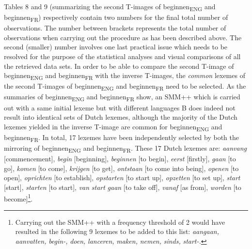Tables 8 and 9 (summarizing the second T-images of beginnen\textsubscript{ENG} and beginnen\textsubscript{FR}) respectively contain two numbers for the final total number of observations. The number between brackets represents the total number of observations when carrying out the procedure as has been described above. The second (smaller) number involves one last practical issue which needs to be resolved for the purpose of the statistical analyses and visual comparisons of all the retrieved data sets. In order to be able to compare the second T-image of beginnen\textsubscript{ENG} and beginnen\textsubscript{FR} with the inverse T-images, the \textit{common} lexemes of the second T-images of beginnen\textsubscript{ENG} and beginnen\textsubscript{FR} need to be selected. As the summaries of beginnen\textsubscript{ENG} and beginnen\textsubscript{FR} show, an SMM++ which is carried out with a same initial lexeme but with different languages B does indeed not result into identical sets of Dutch lexemes, although the majority of the Dutch lexemes yielded in the inverse T-image are common for beginnen\textsubscript{ENG} and beginnen\textsubscript{FR}. In total, 17 lexemes have been independently selected by both the mirroring of beginnen\textsubscript{ENG} and beginnen\textsubscript{FR}. These 17 Dutch lexemes are: \textit{aanvang} [commencement], \textit{begin} [beginning], \textit{beginnen} [to begin], \textit{eerst} [firstly], \textit{gaan} [to go], \textit{komen} [to come], \textit{krijgen} [to get], \textit{ontstaan} [to come into being], \textit{openen} [to open], \textit{oprichten} [to establish], \textit{opstarten} [to start up], \textit{opzetten} [to set up], \textit{start} [start], \textit{starten} [to start], \textit{van} \textit{start} \textit{gaan} [to take off], \textit{vanaf} [as from], \textit{worden} [to become]\footnote{Carrying out the SMM++ with a frequency threshold of 2 would have resulted in the following 9 lexemes to be added to this list: \textit{aangaan,} \textit{aanvatten,} \textit{begin-,} \textit{doen,} \textit{lanceren,} \textit{maken,} \textit{nemen,} \textit{sinds,} \textit{start-.}}.



